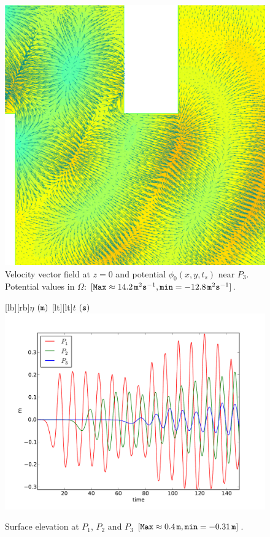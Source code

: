 \begin{figure}[!htb]
{\centering
\includegraphics[width=\largewidth]{chapters/lopes/pdf/pvel2.pdf}
\caption{Velocity vector field at $z=0$ and potential
\(\phi_0(x,y,t_s)\) near $P_3$.\newline
Potential values in \(\Omega\): \([{\tt Max}\approx 14.2\,{\tt m}^{2}{\tt s}^{-1}, {\tt min}=-12.8\, {\tt m}^{2}{\tt s}^{-1}]\).
}\label{lopes:fig:potential1}\par}
\end{figure}
\begin{figure}[!htb]
{\centering
{}[lb][rb]{$\eta$ $({\tt m})$}
[lt][lt]{$t$ $({\tt s})$}
\includegraphics[width=\largewidth]{chapters/lopes/pdf/etaprofile.pdf}
\caption{Surface elevation at $P_1$, $P_2$ and $P_3$
\([{\tt Max}\approx 0.4\, {\tt m}, {\tt min}=-0.31\,{\tt m}]\).}\label{lopes:fig:etap}\par}
\end{figure}
